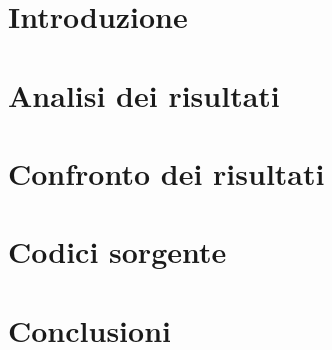 \documentclass[12pt,twoside]{report}
\begin{document}



\tableofcontents

\chapter{Introduzione}


\chapter{Analisi dei risultati}


\chapter{Confronto dei risultati}


\chapter{Codici sorgente}



\chapter*{Conclusioni}

\end{document}
